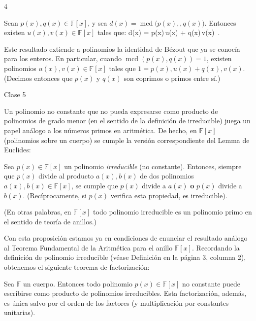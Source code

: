 \documentclass[11pt]{article}
\theoremstyle{plain}
\theoremstyle{definition}
\theoremstyle{definition}
\begin{document}
\begin{multicols}{4}
\begin{tcolorbox}[colback=red!5!white,colframe=red!75!black,title=\textbf{Teorema 2.2.3 (Identidad de Bézout)}]
Sean $p(x), q(x) \in \mathbb{F}[x]$, y sea $d(x) = \operatorname{mcd}\big(p(x),,q(x)\big)$. Entonces existen $u(x), v(x) \in \mathbb{F}[x]$ tales que:
d(x) = p(x)\,u(x) + q(x)\,v(x)~.
\end{tcolorbox}

Este resultado extiende a polinomios la identidad de Bézout que ya se conocía para los enteros. En particular, cuando $\operatorname{mcd}(p(x),q(x)) = 1$, existen polinomios $u(x), v(x) \in \mathbb{F}[x]$ tales que $1 = p(x),u(x) + q(x),v(x)$. (Decimos entonces que $p(x)$ y $q(x)$ son coprimos o primos entre sí.)

Clase 5

Un polinomio no constante que no pueda expresarse como producto de polinomios de grado menor (en el sentido de la definición de irreducible) juega un papel análogo a los números primos en aritmética. De hecho, en $\mathbb{F}[x]$ (polinomios sobre un cuerpo) se cumple la versión correspondiente del Lemma de Euclides:

\begin{tcolorbox}[colback=red!5!white,colframe=red!75!black,title=\textbf{Proposición}]
Sea $p(x) \in \mathbb{F}[x]$ un polinomio \emph{irreducible} (no constante). Entonces, siempre que $p(x)$ divide al producto $a(x),b(x)$ de dos polinomios $a(x), b(x) \in \mathbb{F}[x]$, se cumple que $p(x)$ divide a $a(x)$ \textbf{o} $p(x)$ divide a $b(x)$. (Recíprocamente, si $p(x)$ verifica esta propiedad, es irreducible).
\end{tcolorbox}

{\small (En otras palabras, en $\mathbb{F}[x]$ todo polinomio irreducible es un polinomio primo en el sentido de teoría de anillos.)}

Con esta proposición estamos ya en condiciones de enunciar el resultado análogo al Teorema Fundamental de la Aritmética para el anillo $\mathbb{F}[x]$. Recordando la definición de polinomio irreducible (véase Definición en la página 3, columna 2), obtenemos el siguiente teorema de factorización:

\begin{tcolorbox}[colback=red!5!white,colframe=red!75!black,title=\textbf{Teorema (Factorización única en $\mathbb{F}[x]$)}]
Sea $\mathbb{F}$ un cuerpo. Entonces todo polinomio $p(x) \in \mathbb{F}[x]$ no constante puede escribirse como producto de polinomios irreducibles. Esta factorización, además, es única salvo por el orden de los factores (y multiplicación por constantes unitarias).
\end{tcolorbox}


\end{multicols}
\end{document}
